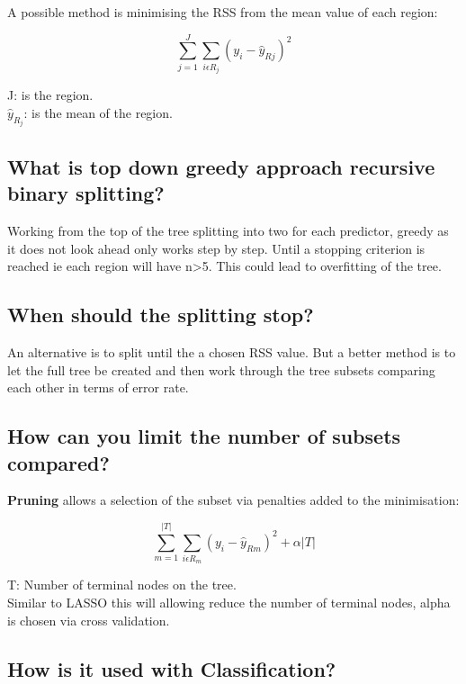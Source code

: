 \documentclass[11pt]{scrartcl} %
\begin{document}
A possible method is minimising the RSS from the mean value of each region:

\begin{equation}
	\sum^J_{j=1}\sum_{i\epsilon R_j}{(y_i-\hat{y}_{Rj})}^2
\end{equation}

J: is the region.\\
\(\hat{y}_{R_j}\): is the mean of the region.

\subsection{What is top down greedy approach recursive binary splitting?}

Working from the top of the tree splitting into two for each predictor, greedy as it does not
look ahead only works step by step. Until a stopping criterion is reached ie each region will have
n>5. This could lead to overfitting of the tree.

\subsection{When should the splitting stop?}

An alternative is to split until the a chosen RSS value. But a better method is to let the full 
tree be created and then work through the tree subsets comparing each other in terms of error rate.

\subsection{How can you limit the number of subsets compared?}

\textbf{Pruning} allows a selection of the subset via penalties added to the minimisation:

\begin{equation}
	\sum^{|T|}_{m=1}\sum_{i\epsilon R_m}{(y_i-\hat{y}_{Rm})}^2 + \alpha|T| 
\end{equation}

T: Number of terminal nodes on the tree.\\

Similar to LASSO this will allowing reduce the number of terminal nodes, alpha is chosen via cross
validation.

\subsection{How is it used with Classification?}
\end{document}
